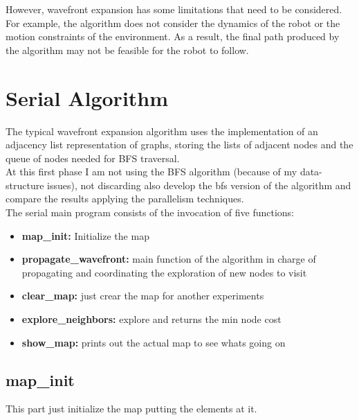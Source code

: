 \documentclass[oneside,twocolumn]{article}
\begin{document}
However, wavefront expansion has some limitations that need to be considered. For example, the algorithm does not consider the dynamics of the robot or the motion constraints of the environment. As a result, the final path produced by the algorithm may not be feasible for the robot to follow.


\newpage
\onecolumn
\section{Serial Algorithm}

The typical wavefront expansion algorithm uses the implementation of an adjacency list representation of graphs, storing the lists of adjacent nodes and the queue of nodes needed for BFS traversal.\\

At this first phase I am not using the BFS algorithm (because of my data-structure issues), not discarding also develop the bfs version of the algorithm and compare the results applying the parallelism techniques.\\

The serial main program consists of the invocation of five functions:

\begin{itemize}
\item \textbf{map\_init:} Initialize the map
\item \textbf{propagate\_wavefront:} main function of the algorithm in charge of propagating and coordinating the exploration of new nodes to visit
\item \textbf{clear\_map:} just crear the map for another experiments
\item \textbf{explore\_neighbors:} explore and returns the min node cost

\item \textbf{show\_map:} prints out the actual map to see whats going on
\end{itemize}

\subsection{map\_init}

This part just initialize the map putting the elements at it.
\end{document}
